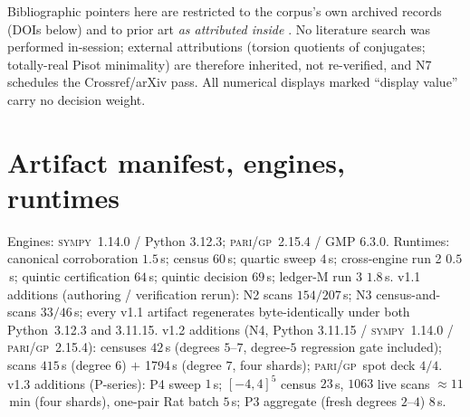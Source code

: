 \documentclass[11pt]{article}
\newcommand{\gp}{\textsc{pari/gp}}
\newcommand{\sy}{\textsc{sympy}}
\theoremstyle{definition}
\begin{document}
Bibliographic pointers here are restricted to the corpus's own archived records
(DOIs below) and to prior art \emph{as attributed inside}
\cite[Rem.~7.20 and refs.~14--16]{relcharge}. No literature search was performed
in-session; external attributions (torsion quotients of conjugates; totally-real
Pisot minimality) are therefore inherited, not re-verified, and N7 schedules the
Crossref/arXiv pass. All numerical displays marked ``display value'' carry no
decision weight.

\appendix

\section{Artifact manifest, engines, runtimes}\label{app:manifest}

Engines: \sy~1.14.0 / Python 3.12.3; \gp~2.15.4 / GMP 6.3.0. Runtimes:
canonical corroboration $1.5$\,s; census $60$\,s; quartic sweep $4$\,s;
cross-engine run 2 $0.5$\,s; quintic certification $64$\,s; quintic decision
$69$\,s; ledger-M run 3 $1.8$\,s. v1.1 additions (authoring / verification
rerun): N2 scans $154/207$\,s; N3 census-and-scans $33/46$\,s; every v1.1
artifact regenerates byte-identically under both Python~3.12.3 and 3.11.15.
v1.2 additions (N4, Python 3.11.15 / \sy~1.14.0 / \gp~2.15.4): censuses
$42$\,s (degrees $5$--$7$, degree-$5$ regression gate included); scans
$415$\,s (degree $6$) $+$ 1794\,s (degree $7$, four shards); \gp\ spot
deck $4/4$. v1.3 additions (P-series): P4 sweep $1$\,s; $[-4,4]^5$ census
$23$\,s, $1063$ live scans $\approx$$11$\,min (four shards), one-pair Rat
batch $5$\,s; P3 aggregate (fresh degrees $2$--$4$) $8$\,s.
\end{document}

